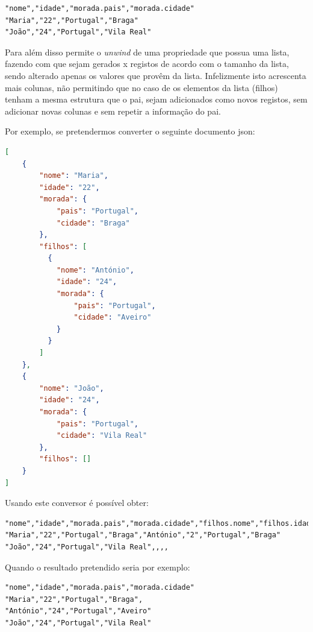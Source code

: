 \begin{lstlisting}[caption=Resultado da conversão do exemplo~\ref{exem:jsonBib} usando o conversor \texttt{json2csv}, label=exem:json2csv]
"nome","idade","morada.pais","morada.cidade"
"Maria","22","Portugal","Braga"
"João","24","Portugal","Vila Real"
\end{lstlisting}

Para além disso permite o \textit{unwind} de uma propriedade que possua uma lista, fazendo com que sejam gerados x registos de acordo com o tamanho da lista, sendo alterado apenas os valores que provêm da lista. Infelizmente isto acrescenta mais colunas, não permitindo que no caso de os elementos da lista (filhos) tenham a mesma estrutura que o pai, sejam adicionados como novos registos, sem adicionar novas colunas e sem repetir a informação do pai. 

Por exemplo, se pretendermos converter o seguinte documento \acrshort{json}:
\begin{lstlisting}[language=json, caption=Outro exemplo em \acrshort{json} a converter, label=exem:jsonBib2]
[
    {
        "nome": "Maria",
        "idade": "22",
        "morada": {
            "pais": "Portugal",
            "cidade": "Braga"
        },
        "filhos": [
          {
            "nome": "António",
            "idade": "24",
            "morada": {
                "pais": "Portugal",
                "cidade": "Aveiro"
            }
          }
        ]
    },
    {
        "nome": "João",
        "idade": "24",
        "morada": {
            "pais": "Portugal",
            "cidade": "Vila Real"
        },
        "filhos": []
    }
]
\end{lstlisting}

Usando este conversor é possível obter:
\begin{lstlisting}[caption=Resultado da conversão do exemplo~\ref{exem:jsonBib2} usando o conversor \texttt{json2csv}]
"nome","idade","morada.pais","morada.cidade","filhos.nome","filhos.idade","filhos.morada.pais","filhos.morada.cidade"
"Maria","22","Portugal","Braga","António","2","Portugal","Braga"
"João","24","Portugal","Vila Real",,,,
\end{lstlisting}

Quando o resultado pretendido seria por exemplo:
\begin{lstlisting}[caption=Resultado pretendido da conversão do exemplo~\ref{exem:jsonBib2}]
"nome","idade","morada.pais","morada.cidade"
"Maria","22","Portugal","Braga",
"António","24","Portugal","Aveiro"
"João","24","Portugal","Vila Real"
\end{lstlisting}

